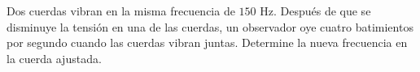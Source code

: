 \item Dos cuerdas vibran en la misma frecuencia de $150\text{ Hz}$. Después de que se disminuye la tensión en una de las cuerdas, un observador oye cuatro batimientos por segundo cuando las cuerdas vibran juntas. Determine la nueva frecuencia en la cuerda ajustada.